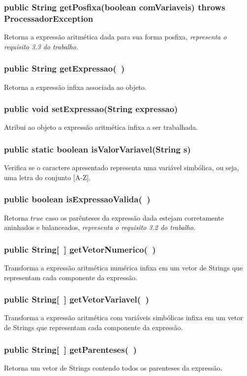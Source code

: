 \documentclass[a4paper,11pt]{article}
\begin{document}
\subsubsection{public String getPosfixa(boolean comVariaveis) throws ProcessadorException}
Retorna a expressão aritmética dada para sua forma posfixa, \emph{representa o requisito 3.3 do trabalho}.

\subsubsection{public String getExpressao(\ )}
Retorna a expressão infixa associada ao objeto.

\subsubsection{public void setExpressao(String expressao) }
Atribui ao objeto a expressão aritmética infixa a ser trabalhada.

\subsubsection{public static boolean isValorVariavel(String s)}
Verifica se o caractere apresentado representa uma variável simbólica, ou seja, uma letra do conjunto [A-Z].

\subsubsection{public boolean isExpressaoValida(\ )}
Retorna \emph{$true$} caso os parênteses da expressão dada estejam corretamente aninhados e balanceados, \emph{representa o requisito 3.2 do trabalho}.

\subsubsection{public String[\ ] getVetorNumerico(\ )}
Transforma a expressão aritmética numérica infixa em um vetor de Strings que representam cada componente da expressão.

\subsubsection{public String[\ ] getVetorVariavel(\ )}
Transforma a expressão aritmética com variáveis simbólicas infixa em um vetor de Strings que representam cada componente da expressão.

\subsubsection{public String[\ ] getParenteses(\ )}
Retorna um vetor de Strings contendo todos os parenteses da expressão.
\end{document}
